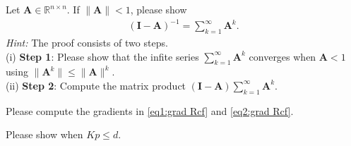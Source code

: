 \documentclass[\toplevelprefix/book-main.tex]{subfiles}
\begin{document}
\begin{exercise}
\end{exercise}


\begin{exercise}\label{ex:neumannn} 
Let $\bm A \in \mathbb{R}^{n\times n}$. If $\|\bm A\| < 1$, please show 
\begin{align}\label{eq:neumann}
    \left( \bm I - \bm A\right)^{-1} = \sum_{k=1}^\infty \bm A^k.  
\end{align}
{\em Hint:} The proof consists of two steps. \\
(i) {\bf Step 1}: Please show that the infite series $\sum_{k=1}^\infty \bm A^k$ converges when $\bm A < 1$ using $\|\bm A^k\| \le \|\bm A\|^k$. \\
(ii) {\bf Step 2}: Compute the matrix product $(\bm I - \bm A) \sum_{k=1}^\infty \bm A^k$. 
\end{exercise}


\begin{exercise}
    Please compute the gradients in \eqref{eq1:grad Rcf} and \eqref{eq2:grad Rcf}. 
\end{exercise}


\begin{exercise}
    Please show  when $Kp \le d$. 
\end{exercise}
\end{document}
